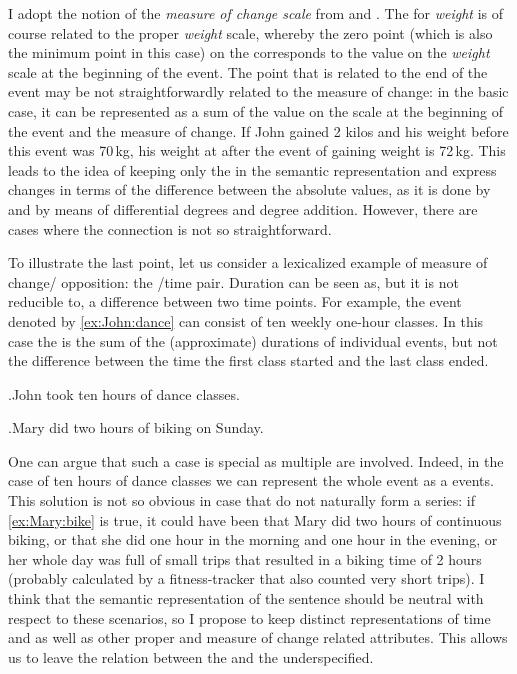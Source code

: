 I adopt the notion of the \textit{measure of change scale} from \citet{KennedyLevin:08} and \citet{Kennedy:12}. The  for \textit{weight} is of course related to the proper \textit{weight} scale, whereby the zero point (which is also the minimum point in this case) on the  corresponds to the value on the \textit{weight} scale at the beginning of the event. The point that is related to the end of the event may be not straightforwardly related to the measure of change: in the basic case, it can be represented as a sum of the value on the scale at the beginning of the event and the measure of change. If John gained 2 kilos and his weight before this event was 70\,kg, his weight at after the event of gaining weight is 72\,kg. This leads to the idea of keeping only the  in the semantic representation and express changes in terms of the difference between the absolute values, as it is done by \citet{Kennedy:01} and \citet{KennedyLevin:02} by means of differential degrees and degree addition. However, there are cases where the connection is not so straightforward.

To illustrate the last point, let us consider a lexicalized example of measure of change/ opposition: the /time pair. Duration can be seen as, but it is not reducible to, a difference between two time points. For example, the event denoted by \ref{ex:John:dance} can consist of ten weekly one-hour classes. In this case the  is the sum of the (approximate) durations of individual events, but not the difference between the time the first class started and the last class ended. 

\ex.\label{ex:John:dance}John took ten hours of dance classes.

\ex.\label{ex:Mary:bike}Mary did two hours of biking on Sunday. 

One can argue that such a case is special as multiple  are involved. Indeed, in the case of ten hours of dance classes we can represent the whole event as a  events. This solution is not so obvious in case  that do not naturally form a series: if \ref{ex:Mary:bike} is true, it could have been that Mary did two hours of continuous biking, or that she did one hour in the morning and one hour in the evening, or her whole day was full of small trips that resulted in a  biking time of 2 hours (probably calculated by a fitness-tracker that also counted very short trips). I think that the semantic representation of the sentence should be neutral with respect to these scenarios, so I propose to keep distinct representations of time and  as well as other proper and measure of change related attributes. This allows us to leave the relation between the  and the  underspecified.


